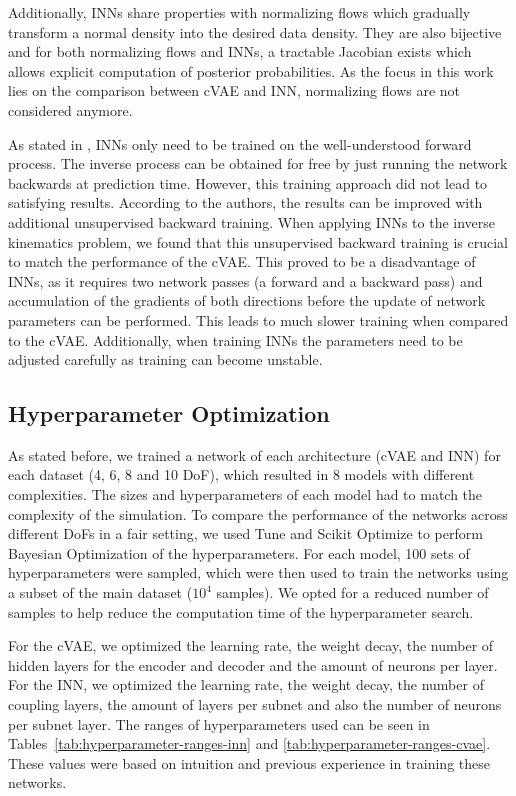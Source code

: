 \documentclass[conference]{IEEEtran}
\begin{document}
Additionally, INNs share properties with normalizing flows \cite{normalizingFlows2010, normalizingFlows2013} which gradually transform a normal density into the desired data density. They are also bijective and for both normalizing flows and INNs, a tractable Jacobian exists which allows explicit computation of posterior probabilities. As the focus in this work lies on the comparison between cVAE and INN, normalizing flows are not considered anymore.

As stated in \cite{Ardizzone2018}, INNs only need to be trained on the well-understood forward process. The inverse process can be obtained for free by just running the network backwards at prediction time. However, this training approach did not lead to satisfying results. According to the authors, the results can be improved with additional unsupervised backward training. When applying INNs to the inverse kinematics problem, we found that this unsupervised backward training is crucial to match the performance of the cVAE. This proved to be a disadvantage of INNs, as it requires two network passes (a forward and a backward pass) and accumulation of the gradients of both directions before the update of network parameters can be performed. This leads to much slower training when compared to the cVAE. Additionally, when training INNs the parameters need to be adjusted carefully as training can become unstable.

\subsection*{Hyperparameter Optimization}

As stated before, we trained a network of each architecture (cVAE and INN) for each dataset (4, 6, 8 and 10 DoF), which resulted in 8 models with different complexities. The sizes and hyperparameters of each model had to match the complexity of the simulation. To compare the performance of the networks across different DoFs in a fair setting, we used Tune \cite{liaw2018tune} and Scikit Optimize \cite{scikit-optimize} to perform Bayesian Optimization of the hyperparameters. For each model, 100 sets of hyperparameters were sampled, which were then used to train the networks using a subset of the main dataset (\( 10^4 \) samples). We opted for a reduced number of samples to help reduce the computation time of the hyperparameter search. 

For the cVAE, we optimized the learning rate, the weight decay, the number of hidden layers for the encoder and decoder and the amount of neurons per layer. For the INN, we optimized the learning rate, the weight decay, the number of coupling layers, the amount of layers per subnet and also the number of neurons per subnet layer. The ranges of hyperparameters used can be seen in Tables~\ref{tab:hyperparameter-ranges-inn} and \ref{tab:hyperparameter-ranges-cvae}. These values were based on intuition and previous experience in training these networks.
\end{document}
